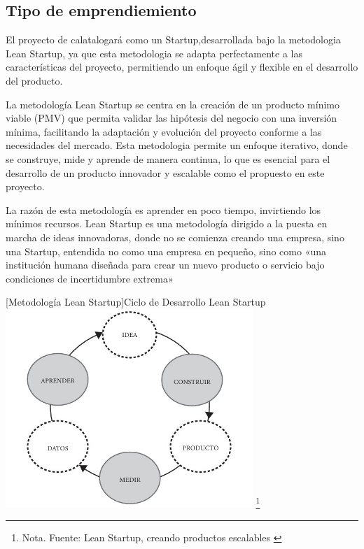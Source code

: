 \subsection*{Tipo de emprendiemiento} El proyecto de calatalogará como un Startup,desarrollada bajo la metodologia Lean Startup, ya que esta metodologia se adapta perfectamente a las características del proyecto, permitiendo un enfoque ágil y flexible en el desarrollo del producto. 

La metodología Lean Startup se centra en la creación de un producto mínimo viable (PMV) que permita validar las hipótesis del negocio con una inversión mínima, facilitando la adaptación y evolución del proyecto conforme a las necesidades del mercado.
Esta metodologia permite un enfoque iterativo, donde se construye, mide y aprende de manera continua, lo que es esencial para el desarrollo de un producto innovador y escalable como el propuesto en este proyecto.

La razón de esta metodología es aprender en poco tiempo, invirtiendo los mínimos recursos. Lean Startup es una metodología dirigido a la puesta en marcha de ideas innovadoras, donde no se comienza creando una empresa, sino una Startup, entendida no como una empresa en pequeño, sino como «una institución humana diseñada para crear un nuevo producto o servicio bajo condiciones de incertidumbre extrema» 
\cite{MetodologiaLean}

\begin{minipage}{0.9\textwidth}
        \centering
        [{Metodología Lean Startup}]{Ciclo de Desarrollo Lean Startup}
        \label{leanStartUp}
         \includegraphics[width=0.7\textwidth]{Content/Images/cicloMetodologiaLean.jpeg}
        \footnote{Nota. \textup{Fuente: Lean Startup, creando productos escalables \cite{GioSyst3m}}}
\end{minipage}

